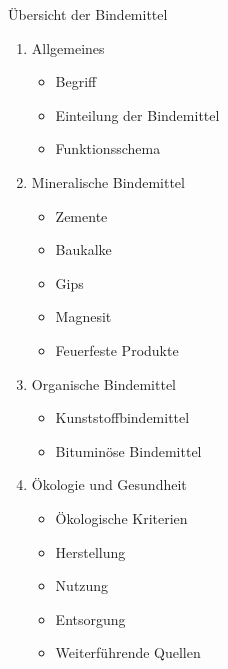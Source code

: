 \begin{frame}{Übersicht der Bindemittel}
    \begin{multicols}{2}
        \begin{enumerate}[label=\textbf{\arabic*}, leftmargin=0.25em, itemsep=0.5em] %
            \item Allgemeines
                  \begin{itemize}[leftmargin=0.5em, itemsep=0.1em]
                      \small
                      \item Begriff
                      \item Einteilung der Bindemittel
                      \item Funktionsschema
                  \end{itemize}

            \item Mineralische Bindemittel
                  \begin{itemize}[leftmargin=0.5em, itemsep=0.1em]
                      \small
                      \item Zemente
                      \item Baukalke
                      \item Gips
                      \item Magnesit
                      \item Feuerfeste Produkte
                  \end{itemize}

            \item Organische Bindemittel
                  \begin{itemize}[leftmargin=0.5em, itemsep=0.1em]
                      \small
                      \item Kunststoffbindemittel
                      \item Bituminöse Bindemittel
                  \end{itemize}

            \item Ökologie und Gesundheit
                  \begin{itemize}[leftmargin=0.5em, itemsep=0.1em]
                      \small
                      \item Ökologische Kriterien
                      \item Herstellung
                      \item Nutzung
                      \item Entsorgung
                      \item Weiterführende Quellen
                  \end{itemize}


\end{enumerate}
\end{multicols}
\end{frame}
